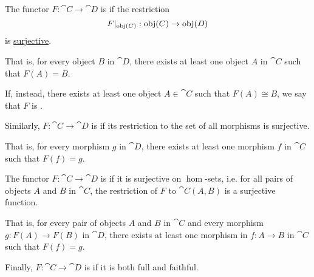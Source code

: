 \begin{definition}
\begin{thmenum}
     The functor \( F: \cat{C} \to \cat{D} \) is  if the restriction
    \begin{equation*}
      F\vert_{\operatorname{obj}(C)}: \operatorname{obj}(C) \to \operatorname{obj}(D)
    \end{equation*}
    is \hyperref[def:function_invertibility/surjective]{surjective}.

    That is, for every object \( B \) in \( \cat{D} \), there exists at least one object \( A \) in \( \cat{C} \) such that \( F(A) = B \).

    If, instead, there exists at least one object \( A \in \cat{C} \) such that \( F(A) \cong B \), we say that \( F \) is .

     Similarly, \( F: \cat{C} \to \cat{D} \) is  if its restriction to the set of all morphisms is surjective.

    That is, for every morphism \( g \) in \( \cat{D} \), there exists at least one morphism \( f \) in \( \cat{C} \) such that \( F(f) = g \).

     The functor \( F: \cat{C} \to \cat{D} \) is  if it is surjective on \( \hom \)-sets, i.e. for all pairs of objects \( A \) and \( B \) in \( \cat{C} \), the restriction of \( F \) to \( \cat{C}(A, B) \) is a surjective function.

    That is, for every pair of objects \( A \) and \( B \) in \( \cat{C} \) and every morphism \( g: F(A) \to F(B) \) in \( \cat{D} \), there exists at least one morphism in \( f: A \to B \) in \( \cat{C} \) such that \( F(f) = g \).

     Finally, \( F: \cat{C} \to \cat{D} \) is  if it is both full and faithful.
  \end{thmenum}
\end{definition}

